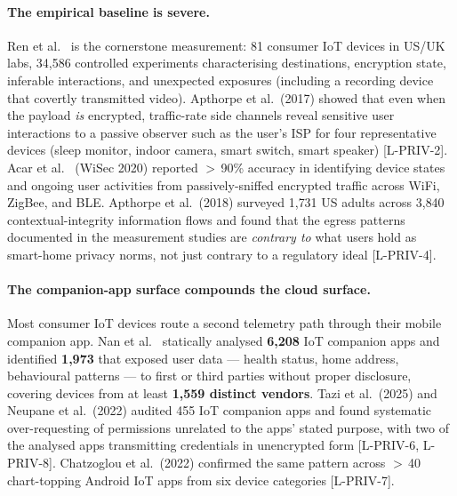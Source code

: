 \documentclass[11pt,a4paper]{article}
\begin{document}
\paragraph{The empirical baseline is severe.}
Ren et al.~\citep{ren2019iotinforming} is the cornerstone measurement:
81 consumer IoT devices in US/UK labs, 34{,}586 controlled experiments
characterising destinations, encryption state, inferable interactions,
and unexpected exposures (including a recording device that covertly
transmitted video). Apthorpe et al.\ (2017) showed that even when the
payload \emph{is} encrypted, traffic-rate side channels reveal
sensitive user interactions to a passive observer such as the user's
ISP for four representative devices (sleep monitor, indoor camera,
smart switch, smart speaker) [L-PRIV-2]. Acar et
al.~\citep{acar2020wisec} (WiSec 2020) reported $>$\,90\% accuracy in
identifying device states and ongoing user activities from
passively-sniffed encrypted traffic across WiFi, ZigBee, and BLE. Apthorpe et al.\ (2018) surveyed 1{,}731 US adults across
3{,}840 contextual-integrity information flows and found that the egress
patterns documented in the measurement studies are \emph{contrary to}
what users hold as smart-home privacy norms, not just contrary to a
regulatory ideal [L-PRIV-4].

\paragraph{The companion-app surface compounds the cloud surface.}
Most consumer IoT devices route a second telemetry path through their
mobile companion app. Nan et al.~\citep{nan2023iotapp} statically
analysed \textbf{6{,}208} IoT companion apps and identified
\textbf{1{,}973} that exposed user data --- health status, home
address, behavioural patterns --- to first or third parties without
proper disclosure, covering devices from at least \textbf{1{,}559
distinct vendors}.
Tazi et al.\ (2025) and Neupane et al.\ (2022) audited 455 IoT companion
apps and found systematic over-requesting of permissions unrelated to
the apps' stated purpose, with two of the analysed apps transmitting
credentials in unencrypted form [L-PRIV-6, L-PRIV-8]. Chatzoglou et al.\
(2022) confirmed the same pattern across $>$\,40 chart-topping Android
IoT apps from six device categories [L-PRIV-7].
\end{document}
